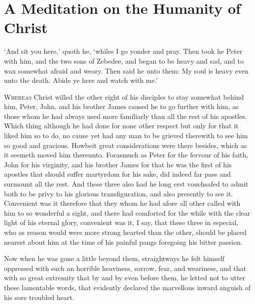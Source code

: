 \documentclass[a5paper]{scrbook}
\begin{document}
	\chapter{A Meditation on the Humanity of Christ}
	
	\begin{scripture}[Mt 26:36-38, Mk 14:32-34]
		‘And sit you here,’ quoth he, ‘whiles I go yonder and pray. Then took he Peter with him, and the two sons of Zebedee, and began to be heavy and sad, and to wax somewhat afraid and weary. Then said he unto them: My soul is heavy even unto the death. Abide ye here and watch with me.’
	\end{scripture}
	
	\vspace{10mm}
	
	\lettrine{W}{hereas} Christ willed the other eight of his disciples to stay somewhat behind him, Peter, John, and his brother James caused he to go further with him, as those whom he had always used more familiarly than all the rest of his apostles. Which thing although he had done for none other respect but only for that it liked him so to do, no cause yet had any man to be grieved therewith to see him so good and gracious. Howbeit great considerations were there besides, which as it seemeth moved him thereunto. Forasmuch as Peter for the fervour of his faith, John for his virginity, and his brother James for that he was the first of his apostles that should suffer martyrdom for his sake, did indeed far pass and surmount all the rest. And these three also had he long erst vouchsafed to admit both to be privy to his glorious transfiguration, and also presently to see it. Convenient was it therefore that they whom he had afore all other called with him to so wonderful a sight, and there had comforted for the while with the clear light of his eternal glory, convenient was it, I say, that these three in especial, who as reason would were more strong hearted than the other, should be placed nearest about him at the time of his painful pangs foregoing his bitter passion.
	
	Now when he was gone a little beyond them, straightways he felt himself oppressed with such an horrible heaviness, sorrow, fear, and weariness, and that with so great extremity that by and by even before them, he letted not to utter these lamentable words, that evidently declared the marvellous inward anguish of his sore troubled heart.
	
\end{document}
